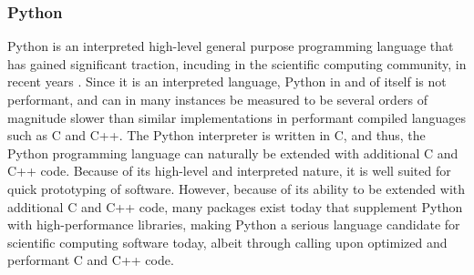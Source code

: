 \subsubsection{Python} \label{background:implementation_tools_and_libraries:python}
Python is an interpreted high-level general purpose programming language that has gained significant traction, incuding in the scientific computing community, in recent years \cite{python,python_popular}.
Since it is an interpreted language, Python in and of itself is not performant, and can in many instances be measured to be several orders of magnitude slower than similar implementations in performant compiled languages such as C and C++.
The Python interpreter is written in C, and thus, the Python programming language can naturally be extended with additional C and C++ code.
Because of its high-level and interpreted nature, it is well suited for quick prototyping of software.
However, because of its ability to be extended with additional C and C++ code, many packages exist today that supplement Python with high-performance libraries, making Python a serious language candidate for scientific computing software today, albeit through calling upon optimized and performant C and C++ code.

